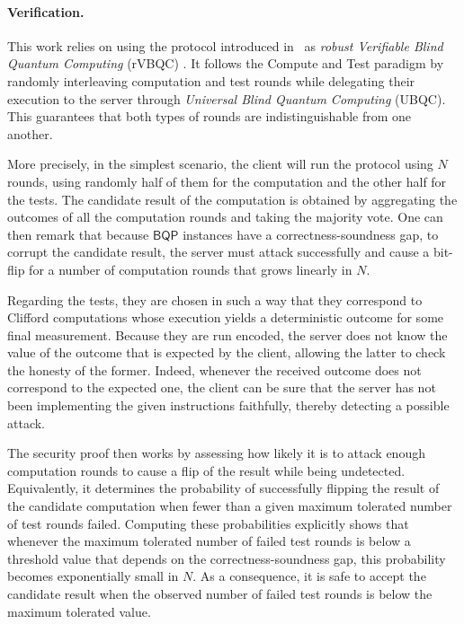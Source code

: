 \paragraph{Verification.}
This work relies on using the protocol introduced in~\cite{LMKO21verifying} as \emph{robust Verifiable Blind Quantum Computing} (rVBQC) \cite{BFK09universal}. It follows the Compute and Test paradigm by randomly interleaving computation and test rounds while delegating their execution to the server through \emph{Universal Blind Quantum Computing} (UBQC). This guarantees that both types of rounds are indistinguishable from one another.

More precisely, in the simplest scenario, the client will run the protocol using $N$ rounds, using randomly half of them for the computation and the other half for the tests. The candidate result of the computation is obtained by aggregating the outcomes of all the computation rounds and taking the majority vote. One can then remark that because $\mathsf{BQP}$ instances have a correctness-soundness gap, to corrupt the candidate result, the server must attack successfully and cause a bit-flip for a number of computation rounds that grows linearly in $N$.

Regarding the tests, they are chosen in such a way that they correspond to Clifford computations whose execution yields a deterministic outcome for some final measurement. Because they are run encoded, the server does not know the value of the outcome that is expected by the client, allowing the latter to check the honesty of the former. Indeed, whenever the received outcome does not correspond to the expected one, the client can be sure that the server has not been implementing the given instructions faithfully, thereby detecting a possible attack.

The security proof then works by assessing how likely it is to attack enough computation rounds to cause a flip of the result while being undetected. Equivalently, it determines the probability of successfully flipping the result of the candidate computation when fewer than a given maximum tolerated number of test rounds failed. Computing these probabilities explicitly shows that whenever the maximum tolerated number of failed test rounds is below a threshold value that depends on the correctness-soundness gap, this probability becomes exponentially small in $N$. As a consequence, it is safe to accept the candidate result when the observed number of failed test rounds is below the maximum tolerated value.

